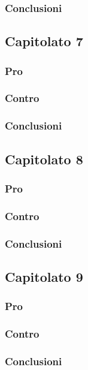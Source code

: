 \subsubsection{Conclusioni}

\subsection{Capitolato 7}

\subsubsection{Pro}

\subsubsection{Contro}

\subsubsection{Conclusioni}

\subsection{Capitolato 8}

\subsubsection{Pro}

\subsubsection{Contro}

\subsubsection{Conclusioni}

\subsection{Capitolato 9}

\subsubsection{Pro}

\subsubsection{Contro}

\subsubsection{Conclusioni}
